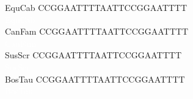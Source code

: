 \documentclass[11pt,twoside,reqno,a4paper]{article}
\begin{document}
{EquCab	CCGGAATTTTAATTCCGGAATTTT\\
\textcolor{white}{EquCab	}\ \ \ \ \ \ \ \ \ \ \ \ \ \ \ \ \ \ \ \ \ \ \ \ \\
CanFam	CCGGAATTTTAATTCCGGAATTTT\\
\textcolor{white}{CanFam	}\ \ \ \ \ \ \ \ \ \ \ \ \ \ \ \ \ \ \ \ \ \ \ \ \\
SusScr	CCGGAATTTTAATTCCGGAATTTT\\
\textcolor{white}{SusScr	}\ \ \ \ \ \ \ \ \ \ \ \ \ \ \ \ \ \ \ \ \ \ \ \ \\
BosTau	CCGGAATTTTAATTCCGGAATTTT\\
\textcolor{white}{BosTau	}\ \ \ \ \ \ \ \ \ \ \ \ \ \ \ \ \ \ \ \ \ \ \ \ \\
\\
}
\end{document}
